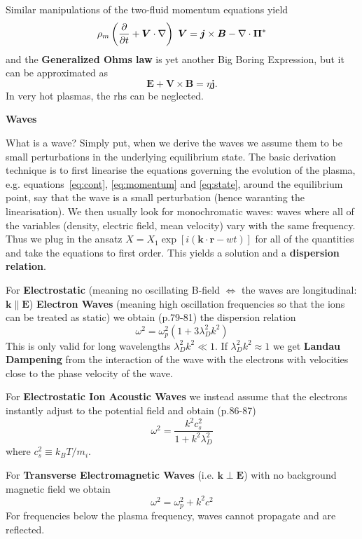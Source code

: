 \documentclass[10pt,landscape]{article}
\renewcommand{\vec}{\bm}
\newcommand{\topiccolor}{green}
\renewcommand{\section}[2]{%
	\renewcommand{\topiccolor}{#2}
	\begin{tcolorbox}[boxsep=0.5mm, left=1mm, right=1mm, top=0mm, bottom=0mm,
		colback=#2!30, colframe=#2, arc is angular]%
		\centering \textbf{#1}%
	\end{tcolorbox}%
	\nopagebreak%
}
\newcommand{\cbf}[1]{\textcolor{\topiccolor!80!black}{\textbf{#1}}}
\begin{document}
\begin{multicols*}{3}
Similar manipulations of the two-fluid momentum equations yield
\[
	\rho_m\left(\diffp{}{t} + \vec V \cdot \nabla\right) \vec V
	= \vec j \times \vec B - \nabla \cdot \vec \Pi^*
\]
and the \cbf{Generalized Ohms law} is yet another Big Boring
Expression\texttrademark, but it can be approximated as
\[
	\vec E + \vec V \times \vec B = \eta \vec j.
\]
In very hot plasmas, the rhs can be neglected.


\section{Waves}{red}

What is a wave?
Simply put, when we derive the waves we assume them to be small
perturbations in the underlying equilibrium state.
The basic derivation technique is
to first linearise the equations governing the evolution of the plasma,
e.g. equations~\eqref{eq:cont}, \eqref{eq:momentum} and \eqref{eq:state},
around the equilibrium point, say that the wave is a small perturbation
(hence waranting the linearisation).
We then usually look for monochromatic waves:
waves where all of the variables
(density, electric field, mean velocity)
vary with the same frequency.
Thus we plug in the ansatz $X = X_1 \exp[i(\vec k \cdot \vec r - w t)]$
for all of the quantities and take the equations to first order.
This yields a solution and a \cbf{dispersion relation}.

For \cbf{Electrostatic} (meaning no oscillating B-field $\iff$ the waves
are longitudinal: $\vec k \parallel \vec E$)
\cbf{Electron Waves} (meaning high oscillation frequencies so that the ions
can be treated as static) we obtain (p.79-81) the dispersion relation
\[
	\omega^2 = \omega_p^2 (1 + 3 \lambda_D^2 k^2)
\]
This is only valid for long wavelengths $\lambda_D^2 k^2 \ll 1$.
If $\lambda_D^2 k^2 \approx 1$ we get \cbf{Landau Dampening}
from the interaction of the wave with the electrons with velocities close to the
phase velocity of the wave.

For \cbf{Electrostatic Ion Acoustic Waves} we instead assume that the electrons
instantly adjust to the potential field and obtain (p.86-87)
\[
	\omega^2 = \frac{k^2 c_s^2}{1+k^2 \lambda_D^2}
\]
where $c_s^2 \equiv k_BT/m_i$.

For \cbf{Transverse Electromagnetic Waves} (i.e. $\vec k \perp \vec E$)
with no background magnetic field we obtain 
\begin{equation*}
	\omega^2 = \omega_p^2 +  k^2 c^2
\end{equation*}
For frequencies below the plasma frequency, waves cannot propagate and are
reflected.


\end{multicols*}
\end{document}
